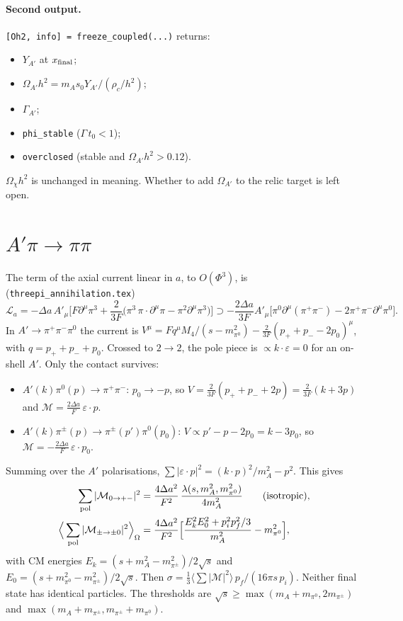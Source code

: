 \documentclass{article}
\newcommand{\Da}{\Delta a}
\begin{document}
\paragraph{Second output.} \texttt{[Oh2, info] = freeze\_coupled(...)} returns:
\begin{itemize}
\item $Y_{A'}$ at $x_{\rm final}$;
\item $\Omega_{A'}h^2=m_A s_0Y_{A'}/(\rho_c/h^2)$;
\item $\Gamma_{A'}$;
\item \texttt{phi\_stable} ($\Gamma\,t_0<1$);
\item \texttt{overclosed} (stable and $\Omega_{A'}h^2>0.12$).
\end{itemize}
$\Omega_\chi h^2$ is unchanged in meaning. Whether to add $\Omega_{A'}$ to the relic target is
left open.

\section{$A'\pi\to\pi\pi$}

The term of the axial current linear in $a$, to $O(\Phi^3)$, is
(\texttt{threepi\_annihilation.tex})
\begin{equation}
\mathcal L_a=-\Da\,A'_\mu\Big[F\partial^\mu\pi^3+\frac{2}{3F}\big(\pi^3\,\pi\!\cdot\!\partial^\mu\pi
-\pi^2\partial^\mu\pi^3\big)\Big]
\supset-\frac{2\Da}{3F}A'_\mu\Big[\pi^0\partial^\mu(\pi^+\pi^-)-2\pi^+\pi^-\partial^\mu\pi^0\Big].
\end{equation}
In $A'\to\pi^+\pi^-\pi^0$ the current is
$V^\mu=F q^\mu M_4/(s-m_{\pi^0}^2)-\tfrac{2}{3F}(p_++p_--2p_0)^\mu$, with $q=p_++p_-+p_0$. Crossed
to $2\to2$, the pole piece is $\propto k\cdot\varepsilon=0$ for an on-shell $A'$. Only the
contact survives:
\begin{itemize}
\item $A'(k)\pi^0(p)\to\pi^+\pi^-$: $p_0\to-p$, so $V=\tfrac{2}{3F}(p_++p_-+2p)=\tfrac{2}{3F}(k+3p)$
  and $\mathcal M=\tfrac{2\Da}{F}\,\varepsilon\cdot p$.
\item $A'(k)\pi^\pm(p)\to\pi^\pm(p')\pi^0(p_0)$: $V\propto p'-p-2p_0=k-3p_0$, so
  $\mathcal M=-\tfrac{2\Da}{F}\,\varepsilon\cdot p_0$.
\end{itemize}
Summing over the $A'$ polarisations,
$\sum|\varepsilon\cdot p|^2=(k\cdot p)^2/m_A^2-p^2$. This gives
\begin{align}
\sum_{\rm pol}|\mathcal M_{0\to+-}|^2&=\frac{4\Da^2}{F^2}\,\frac{\lambda(s,m_A^2,m_{\pi^0}^2)}{4m_A^2}
\qquad\text{(isotropic)},\\
\Big\langle\sum_{\rm pol}|\mathcal M_{\pm\to\pm0}|^2\Big\rangle_\Omega&=\frac{4\Da^2}{F^2}
\Big[\frac{E_k^2E_0^2+p_i^2p_f^2/3}{m_A^2}-m_{\pi^0}^2\Big],
\end{align}
with CM energies $E_k=(s+m_A^2-m_{\pi^\pm}^2)/2\sqrt s$ and $E_0=(s+m_{\pi^0}^2-m_{\pi^\pm}^2)/2\sqrt s$.
Then $\sigma=\tfrac13\langle\sum|\mathcal M|^2\rangle\,p_f/(16\pi s\,p_i)$. Neither final state
has identical particles. The thresholds are
$\sqrt s\ge\max(m_A+m_{\pi^0},2m_{\pi^\pm})$ and $\max(m_A+m_{\pi^\pm},m_{\pi^\pm}+m_{\pi^0})$.
\end{document}
